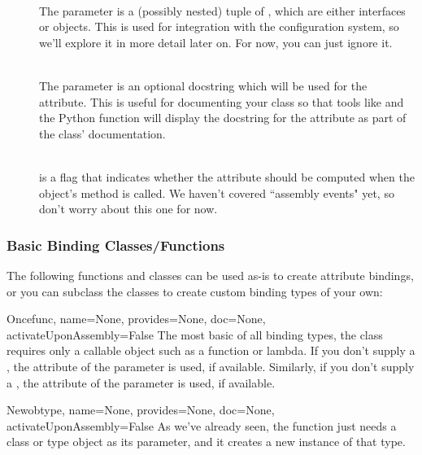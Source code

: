 \begin{verbatim%
}
\begin{verbatim%
}
\begin{verbatim%
}
\begin{verbatim%
}
\begin{verbatim%
}
\begin{verbatim%
}
\begin{verbatim%
}
\begin{verbatim%
}
\begin{verbatim%
}
\begin{description}
\item[] \hfill \\
The  parameter is a (possibly nested) tuple of
, which are either interfaces or 
objects.  This is used for integration with the configuration system, so we'll
explore it in more detail later on.  For now, you can just ignore it.

\item[] \hfill \\
The  parameter is an optional docstring which will be used for the
attribute.  This is useful for documenting your class so that tools like
 and the Python  function will display the
docstring for the attribute as part of the class' documentation.

\item[] \hfill \\
 is a flag that indicates whether the attribute should
be computed when the object's  method is called.  We
haven't covered ``assembly events" yet, so don't worry about this one for now.

\end{description}

\subsubsection{Basic Binding Classes/Functions}

The following functions and classes can be used as-is to create attribute
bindings, or you can subclass the classes to create custom binding types
of your own:

\begin{funcdesc}{Once}{func, name=None, provides=None, doc=None, activateUponAssembly=False}
The most basic of all binding types, the  class requires
only a callable object such as a function or lambda.  If you don't supply a
, the  attribute of the  parameter is used,
if available.  Similarly, if you don't supply a , the 
attribute of the  parameter is used, if available.
\end{funcdesc}

\begin{funcdesc}{New}{obtype, name=None, provides=None, doc=None,
activateUponAssembly=False}
As we've already seen, the  function just needs a class or
type object as its  parameter, and it creates a new instance of that
type.


\end{funcdesc}
\end{verbatim%
}
\end{verbatim%
}
\end{verbatim%
}
\end{verbatim%
}
\end{verbatim%
}
\end{verbatim%
}
\end{verbatim%
}
\end{verbatim%
}
\end{verbatim%
}
